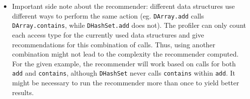 \begin{itemize}
		\item Important side note about the recommender: different data structures use different
			ways to perform the same action (eg. \texttt{DArray.add} calls
			\texttt{DArray.contains}, while \texttt{DHashSet.add} does not). The profiler can only
			count each access type for the currently used data structures and give recommendations
			for this combination of calls. Thus, using another combination might not lead to the
			complexity the recommender computed. For the given example, the recommender will work
			based on calls for both \texttt{add} and \texttt{contains}, although \texttt{DHashSet}
			never calls \texttt{contains} within \texttt{add}. It might be necessary to run the
			recommender more than once to yield better results.
	\end{itemize}
